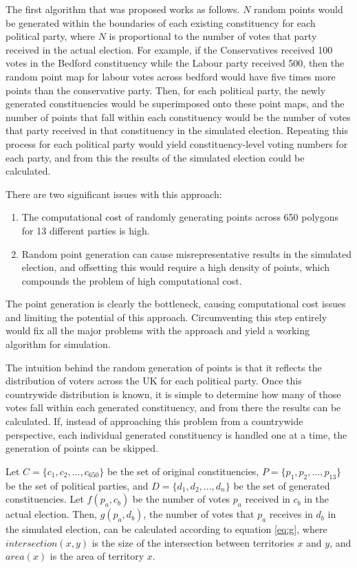 \documentclass{article}
\begin{document}
The first algorithm that was proposed works as follows. $N$ random points would be generated within the boundaries of each existing constituency for each political party, where $N$ is proportional
to the number of votes that party received in the actual election. For example, if the Conservatives received 100 votes in the Bedford constituency while the Labour party received 500, then the random
point map for labour votes across bedford would have five times more points than the conservative party. Then, for each political party, the newly generated constituencies would be superimposed onto
these point maps, and the number of points that fall within each constituency would be the number of votes that party received in that constituency in the simulated election. Repeating this process
for each political party would yield constituency-level voting numbers for each party, and from this the results of the simulated election could be calculated.

There are two significant issues with this approach:

\begin{enumerate}
    \item The computational cost of randomly generating points across 650 polygons for 13 different parties is high.
    \item Random point generation can cause misrepresentative results in the simulated election, and offsetting this would require a high density of points, which compounds the problem of high computational cost.
\end{enumerate}

The point generation is clearly the bottleneck, causing computational cost issues and limiting the potential of this approach. Circumventing this step entirely would fix all the major problems with 
the approach and yield a working algorithm for simulation.

The intuition behind the random generation of points is that it reflects the distribution of voters across the UK for each political party. Once this countrywide distribution is known, it is simple
to determine how many of those votes fall within each generated constituency, and from there the results can be calculated. If, instead of approaching this problem from a countrywide perspective,
each individual generated constituency is handled one at a time, the generation of points can be skipped. 

Let $C = \{c_1, c_2, ..., c_{650}\}$ be the set of original constituencies, $P = \{p_1, p_2, ..., p_{13}\}$ be the set of political parties, and $D = \{d_1, d_2, ..., d_n\}$ be the set of generated
constituencies. Let $f(p_a, c_b)$ be the number of votes $p_a$ received in $c_b$ in the actual election. Then, $g(p_a, d_b)$, the number of votes that $p_a$ receives in $d_b$ in
the simulated election, can be calculated according to equation \ref{eq:g}, where $intersection(x,y)$ is the size of the intersection between territories $x$ and $y$, and $area(x)$ is the area of territory $x$.
\end{document}
